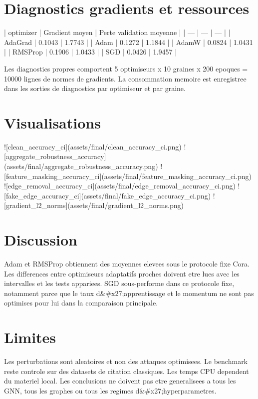 \documentclass[11pt,a4paper]{article}
\begin{document}
\section{Diagnostics gradients et ressources}
\par
| optimizer | Gradient moyen | Perte validation moyenne |
| --- | --- | --- |
| AdaGrad | 0.1043 | 1.7743 |
| Adam | 0.1272 | 1.1844 |
| AdamW | 0.0824 | 1.0431 |
| RMSProp | 0.1906 | 1.0433 |
| SGD | 0.0426 | 1.9457 |
\par
Les diagnostics propres comportent 5 optimiseurs x 10 graines x 200 epoques = 10000 lignes de normes de gradients. La consommation memoire est enregistree dans les sorties de diagnostics par optimiseur et par graine.
\par
\section{Visualisations}
\par
![clean_accuracy_ci](assets/final/clean_accuracy_ci.png)
![aggregate_robustness_accuracy](assets/final/aggregate_robustness_accuracy.png)
![feature_masking_accuracy_ci](assets/final/feature_masking_accuracy_ci.png)
![edge_removal_accuracy_ci](assets/final/edge_removal_accuracy_ci.png)
![fake_edge_accuracy_ci](assets/final/fake_edge_accuracy_ci.png)
![gradient_l2_norms](assets/final/gradient_l2_norms.png)
\par
\section{Discussion}
\par
Adam et RMSProp obtiennent des moyennes elevees sous le protocole fixe Cora. Les differences entre optimiseurs adaptatifs proches doivent etre lues avec les intervalles et les tests appariees. SGD sous-performe dans ce protocole fixe, notamment parce que le taux d&#x27;apprentissage et le momentum ne sont pas optimises pour lui dans la comparaison principale.
\par
\section{Limites}
\par
Les perturbations sont aleatoires et non des attaques optimisees. Le benchmark reste controle sur des datasets de citation classiques. Les temps CPU dependent du materiel local. Les conclusions ne doivent pas etre generalisees a tous les GNN, tous les graphes ou tous les regimes d&#x27;hyperparametres.
\par
\end{document}
